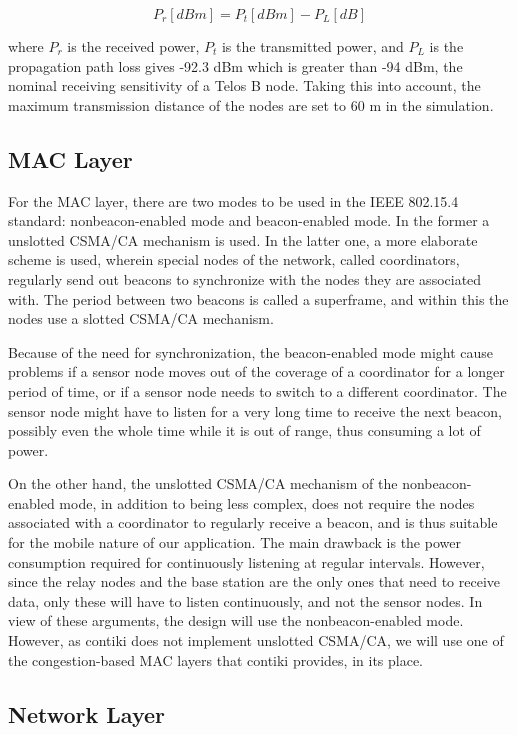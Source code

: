 \documentclass[conference]{IEEEtran}
\begin{document}
\begin{displaymath}
    P_{r}[dBm] = P_{t}[dBm] - P_{L}[dB]
\end{displaymath}

where $P_{r}$ is the received power, $P_{t}$ is the transmitted power, and
$P_{L}$ is the propagation path loss gives -92.3 dBm which is greater than -94
dBm, the nominal receiving sensitivity of a Telos B node. Taking this into
account, the maximum transmission distance of the nodes are set to 60 m in the
simulation.

\subsection{MAC Layer}

For the MAC layer, there are two modes to be used in the IEEE 802.15.4
standard: nonbeacon-enabled mode and beacon-enabled mode. In the former
a unslotted CSMA/CA mechanism is used. In the latter one, a more elaborate
scheme is used, wherein special nodes of the network, called coordinators,
regularly send out beacons to synchronize with the nodes they are associated
with. The period between two beacons is called a superframe, and within this
the nodes use a slotted CSMA/CA mechanism.

Because of the need for synchronization, the beacon-enabled mode might cause
problems if a sensor node moves out of the coverage of a coordinator for
a longer period of time, or if a sensor node needs to switch to a different
coordinator.  The sensor node might have to listen for a very long time to
receive the next beacon, possibly even the whole time while it is out of range,
thus consuming a lot of power.

On the other hand, the unslotted CSMA/CA mechanism of the nonbeacon-enabled
mode, in addition to being less complex, does not require the nodes associated
with a coordinator to regularly receive a beacon, and is thus suitable for the
mobile nature of our application. The main drawback is the power consumption
required for continuously listening at regular intervals.  However, since the
relay nodes and the base station are the only ones that need to receive data,
only these will have to listen continuously, and not the sensor nodes. In view
of these arguments, the design will use the nonbeacon-enabled mode. However, as
contiki does not implement unslotted CSMA/CA, we will use one of the
congestion-based MAC layers that contiki provides, in its place.

\subsection{Network Layer}
\end{document}
